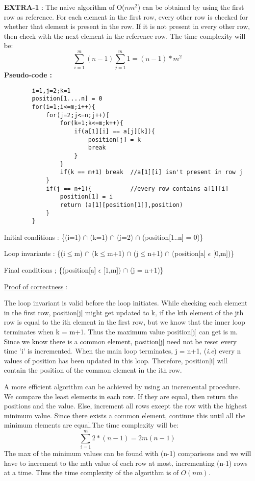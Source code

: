 \documentclass[12pt]{article}
\begin{document}
\begin{enumerate}
    \textbf{EXTRA-1} : 
    The naive algorithm of O($nm^2$) can be obtained by using the first row as reference. For each element in the first row, every other row is checked for whether that element is present in the row. If it is not present in every other row, then check with the next element in the reference row.
    The time complexity will be:
    \[\sum_{i=1}^{m}(n-1)\sum_{j=1}^{m}1 = (n-1)*m^2 \]
    \textbf{Pseudo-code :}
    \begin{verbatim}
        i=1,j=2;k=1
        position[1....n] = 0
        for(i=1;i<=m;i++){
            for(j=2;j<=n;j++){
                for(k=1;k<=m;k++){
                    if(a[1][i] == a[j][k]){
                        position[j] = k
                        break
                    }
                }
                if(k == m+1) break  //a[1][i] isn't present in row j
            }
            if(j == n+1){           //every row contains a[1][i]
                position[1] = i
                return (a[1][position[1]],position)
            }
        }
    \end{verbatim}
    Initial conditions : \{(i=1) $\cap$ (k=1) $\cap$ (j=2) $\cap$ (position[1..n] = 0)\}
    
    Loop invariants : \{(i$\leq$m) $\cap$ (k$\leq$m+1) $\cap$ (j$\leq$n+1) $\cap$ (position[a] $\epsilon$ [0,m])\}
    
    Final conditions ; \{(position[a] $\epsilon$ [1,m]) $\cap$ (j = n+1)\}
    
    \underline{Proof of correctness} :
    
    The loop invariant is valid before the loop initiates. While checking each element in the first row, position[j] might get updated to k, if the kth element of the jth row is equal to the ith element in the first row, but we know that the inner loop terminates when k = m+1. Thus the maximum value position[j] can get is m. Since we know there is a common element, position[j] need not be reset every time 'i' is incremented. When the main loop terminates, j = n+1, (\textit{i.e}) every n values of position has been updated in this loop. Therefore, position[i] will contain the position of the common element in the ith row.  
    
    A more efficient algorithm can be achieved by using an incremental procedure. We compare the least elements in each row. If they are equal, then return the positions and the value. Else, increment all rows except the row with the highest minimum value. Since there exists a common element, continue this until all the minimum elements are equal.The time complexity will be: 
    \[\sum_{i=1}^{m}2*(n-1) = 2m(n-1)\]
    The max of the minimum values can be found with (n-1) comparisons and we will have to increment to the mth value of each row at most, incrementing (n-1) rows at a time. Thus the time complexity of the algorithm is of $O(nm)$.
    

\end{enumerate}
\end{document}
